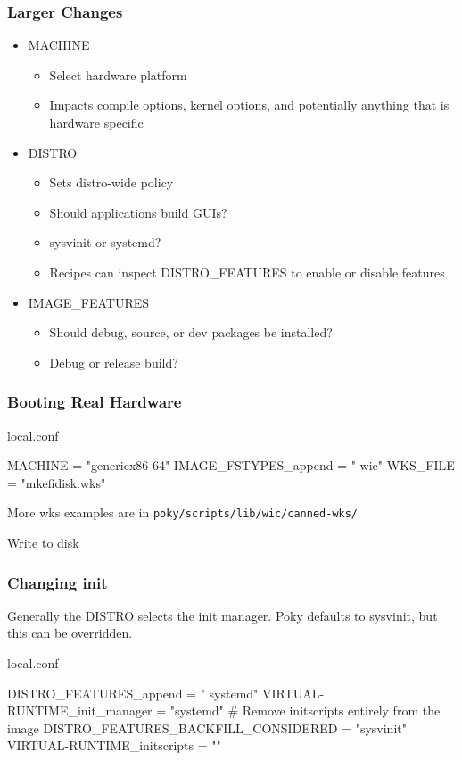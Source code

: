 \documentclass[aspectratio=169]{beamer}
\begin{document}
\begin{frame}
\frametitle{Larger Changes}
\begin{itemize}
	\item MACHINE
	\begin{itemize}
		\item Select hardware platform
		\item Impacts compile options, kernel options, and potentially anything that is hardware specific
	\end{itemize}
	\item DISTRO
	\begin{itemize}
		\item Sets distro-wide policy
		\item Should applications build GUIs?
		\item sysvinit or systemd?
		\item Recipes can inspect DISTRO\_FEATURES to enable or
		      disable features
	\end{itemize}
	\item IMAGE\_FEATURES
	\begin{itemize}
		\item Should debug, source, or dev packages be installed?
		\item Debug or release build?
	\end{itemize}
\end{itemize}
\end{frame}

\begin{frame}[fragile]
\frametitle{Booting Real Hardware}
\begin{block}{local.conf}
\begin{semiverbatim}
MACHINE = "genericx86-64"
IMAGE\_FSTYPES\_append = " wic"
WKS_FILE = "mkefidisk.wks"
\end{semiverbatim}
\end{block}
More wks examples are in \texttt{poky/scripts/lib/wic/canned-wks/}
\begin{block}{Write to disk}
\end{block}
\end{frame}

\begin{frame}[fragile]
\frametitle{Changing init}
Generally the DISTRO selects the init manager. Poky defaults to sysvinit,
but this can be overridden.
\begin{block}{local.conf}
\begin{semiverbatim}
DISTRO\_FEATURES\_append = " systemd"
VIRTUAL-RUNTIME\_init\_manager = "systemd"
# Remove initscripts entirely from the image
DISTRO\_FEATURES\_BACKFILL\_CONSIDERED = "sysvinit"
VIRTUAL-RUNTIME\_initscripts = ""
\end{semiverbatim}
\end{block}
\end{frame}
\end{document}

